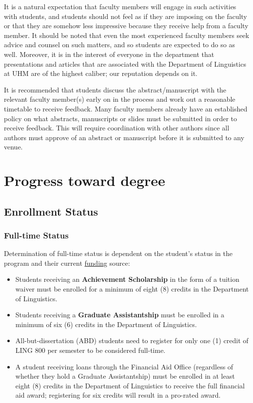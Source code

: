 \documentclass[
]{book}
\begin{document}
It is a natural expectation that faculty members will engage in such activities with students, and students should not feel as if they are imposing on the faculty or that they are somehow less impressive because they receive help from a faculty member. It should be noted that even the most experienced faculty members seek advice and counsel on such matters, and so students are expected to do so as well. Moreover, it is in the interest of everyone in the department that presentations and articles that are associated with the Department of Linguistics at UHM are of the highest caliber; our reputation depends on it.

It is recommended that students discuss the abstract/manuscript with the relevant faculty member(s) early on in the process and work out a reasonable timetable to receive feedback. Many faculty members already have an established policy on what abstracts, manuscripts or slides must be submitted in order to receive feedback. This will require coordination with other authors since all authors must approve of an abstract or manuscript before it is submitted to any venue.

\hypertarget{progress-toward-degree}{%
\chapter{Progress toward degree}\label{progress-toward-degree}}

\hypertarget{enrollment-status}{%
\section{Enrollment Status}\label{enrollment-status}}

\hypertarget{full-time-status}{%
\subsection{Full-time Status}\label{full-time-status}}

Determination of full-time status is dependent on the student's status in the program and their current \protect\hyperlink{funding-1}{funding} source:

\begin{itemize}
\item
  Students receiving an \textbf{Achievement Scholarship} in the form of a tuition waiver must be enrolled for a minimum of eight (8) credits in the Department of Linguistics.
\item
  Students receiving a \textbf{Graduate Assistantship} must be enrolled in a minimum of six (6) credits in the Department of Linguistics.
\item
  All-but-dissertation (ABD) students need to register for only one (1) credit of LING 800 per semester to be considered full-time.
\item
  A student receiving loans through the Financial Aid Office (regardless of whether they hold a Graduate Assistantship) must be enrolled in at least eight (8) credits in the Department of Linguistics to receive the full financial aid award; registering for six credits will result in a pro-rated award.
\end{itemize}
\end{document}
